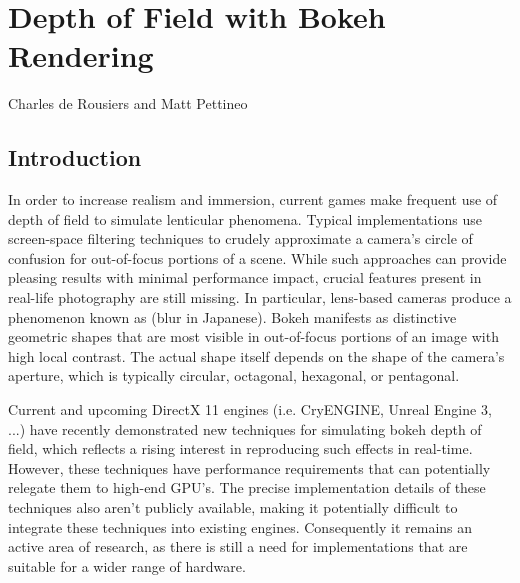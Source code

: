 \chapter{Depth of Field with Bokeh Rendering}{Charles de Rousiers and Matt Pettineo}
\label{BokehRendering}

\section{Introduction}

In order to increase realism and immersion, current games make frequent use of depth of field to simulate lenticular phenomena. Typical implementations use screen-space filtering techniques to crudely approximate a camera’s circle of confusion for out-of-focus portions of a scene. While such approaches can provide pleasing results with minimal performance impact, crucial features present in real-life photography are still missing. In particular, lens-based cameras produce a phenomenon known as \bokeh (blur in Japanese). Bokeh manifests as distinctive geometric shapes that are most visible in out-of-focus portions of an image with high local contrast. The actual shape itself depends on the shape of the camera’s aperture, which is typically circular, octagonal, hexagonal, or pentagonal.

Current and upcoming DirectX 11 engines (i.e. CryENGINE, Unreal Engine 3, ...) have recently demonstrated new techniques for simulating bokeh depth of field, which reflects a rising interest in reproducing such effects in real-time. However, these techniques have performance requirements that can potentially relegate them to high-end GPU's. The precise implementation details of these techniques also aren't publicly available, making it potentially difficult to integrate these techniques into existing engines. Consequently it remains an active area of research, as there is still a need for implementations that are suitable for a wider range of hardware.


